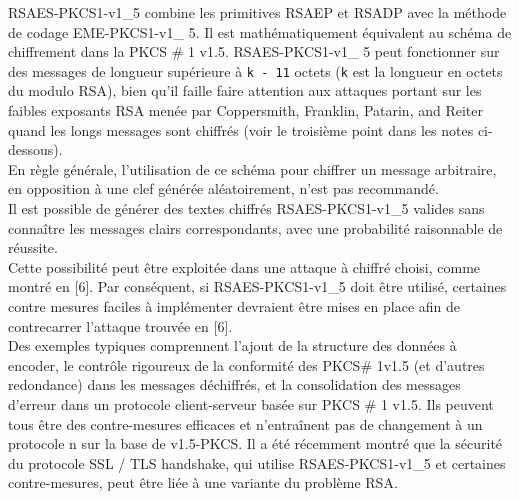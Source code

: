    RSAES-PKCS1-v1\_5 combine les primitives RSAEP et RSADP avec la méthode de codage EME-PKCS1-v1\_ 5. Il est mathématiquement équivalent au schéma de chiffrement dans la PKCS \# 1 v1.5. RSAES-PKCS1-v1\_ 5 peut fonctionner sur des messages de longueur supérieure à \texttt{k - 11} octets (\texttt{k} est la longueur en octets du modulo RSA), bien qu'il faille faire attention aux attaques portant sur les faibles exposants RSA menée par Coppersmith, Franklin, Patarin, and Reiter quand les longs messages sont chiffrés (voir le troisième point dans les notes ci-dessous).\\
En règle générale, l'utilisation de ce schéma pour chiffrer un message arbitraire, en opposition à une clef générée aléatoirement, n'est pas recommandé.\\
Il est possible de générer des textes chiffrés RSAES-PKCS1-v1\_5 valides sans connaître les messages clairs correspondants, avec une probabilité raisonnable de réussite.\\
Cette possibilité peut être exploitée dans une attaque à chiffré choisi, comme montré en [6]. Par conséquent, si RSAES-PKCS1-v1\_5 doit être utilisé, certaines contre mesures faciles à implémenter devraient être mises en place afin de contrecarrer l'attaque trouvée en [6].\\
Des exemples typiques comprennent l'ajout de la structure des données à encoder, le contrôle rigoureux de la conformité des PKCS\# 1v1.5 (et d'autres redondance) dans les messages déchiffrés, et la consolidation des messages d'erreur dans un protocole client-serveur basée sur PKCS \# 1 v1.5. Ils peuvent tous être des contre-mesures efficaces et n'entraînent pas de changement à un protocole n sur la base de v1.5-PKCS. Il a été récemment montré que la sécurité du protocole SSL / TLS handshake, qui utilise RSAES-PKCS1-v1\_5 et certaines contre-mesures, peut être liée à une variante du problème RSA.\\
  
